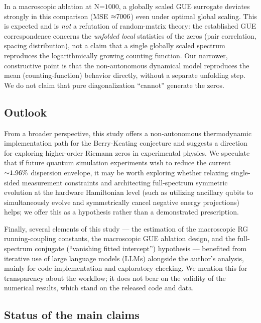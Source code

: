 \documentclass[fractalfract,article,submit,oneauthor,pdftex]{Definitions/mdpi}
\begin{document}
In a macroscopic ablation at \(\text{N}\text{=1000}\), a globally scaled
GUE surrogate deviates strongly in this comparison (MSE
\(\text{\ensuremath{\approx}7006}\)) even under optimal global scaling. This is expected
and is \emph{not} a refutation of random-matrix theory: the established
GUE correspondence concerns the \emph{unfolded local} statistics of the
zeros (pair correlation, spacing distribution), not a claim that a single
globally scaled spectrum reproduces the logarithmically growing counting
function. Our narrower, constructive point is that the non-autonomous
dynamical model reproduces the mean (counting-function) behavior
directly, without a separate unfolding step. We do not claim that pure
diagonalization ``cannot'' generate the zeros.

\subsection{Outlook}

From a broader perspective, this study offers a non-autonomous
thermodynamic implementation path
for the Berry-Keating conjecture and suggests a direction for
exploring higher-order Riemann zeros in experimental physics. We speculate
that if future quantum simulation experiments wish to reduce the
current \(\text{\ensuremath{\sim}1.96\%}\) dispersion envelope, it may be worth
exploring whether relaxing single-sided measurement constraints and
architecting full-spectrum symmetric evolution at the hardware Hamiltonian
level (such as utilizing ancillary qubits to simultaneously evolve and
symmetrically cancel negative energy projections) helps; we offer this as
a hypothesis rather than a demonstrated prescription.

Finally, several elements of this study --- the estimation of the
macroscopic RG running-coupling constants, the macroscopic GUE ablation
design, and the full-spectrum conjugate (``vanishing fitted intercept'')
hypothesis --- benefited from iterative use of large language models
(LLMs) alongside the author's analysis, mainly for code implementation
and exploratory checking. We mention this for transparency about the
workflow; it does not bear on the validity of the numerical results,
which stand on the released code and data.

\subsection{Status of the main claims}
\end{document}

